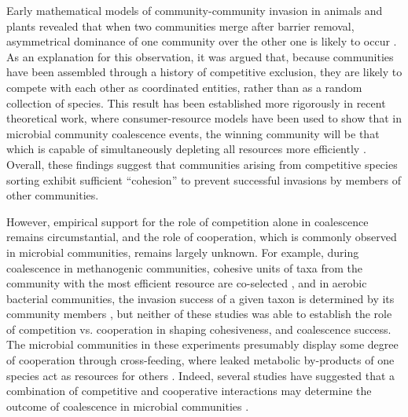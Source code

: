 \documentclass[10pt,letterpaper]{article}
\begin{document}
Early mathematical models of community-community invasion in animals and plants revealed that when two communities merge after barrier removal, asymmetrical dominance of one community over the other one is likely to occur \cite{Gilpin1994, Toquenaga1997}. As an explanation for this observation, it was argued that, because communities have been assembled through a history of competitive exclusion, they are likely to compete with each other as coordinated entities, rather than as a random collection of species. This result has been established more rigorously in recent theoretical work, where consumer-resource models have been used to show that in microbial community coalescence events, the winning community will be that which is capable of simultaneously depleting all resources more efficiently \cite{Tikhonov2016}. Overall, these findings suggest that communities arising from competitive species sorting exhibit sufficient ``cohesion'' to prevent successful invasions by members of other communities. 

However, empirical support for the role of competition alone in coalescence remains circumstantial, and the role of cooperation, which is commonly observed in microbial communities, remains largely unknown. For example, during coalescence in methanogenic communities, cohesive units of taxa from the community with the most efficient resource are co-selected \cite{Sierocinski2017}, and in aerobic bacterial communities, the invasion success of a given taxon is determined by its community members \cite{Lu2018}, but neither of these studies was able to establish the role of competition vs. cooperation in shaping cohesiveness, and coalescence success. The microbial communities in these experiments presumably display some degree of cooperation through cross-feeding, where leaked metabolic by-products of one species act as resources for others \cite{Hansen2007, Lawrence2012, Embree2015}. %
Indeed, several studies have suggested that a combination of competitive and cooperative interactions may determine the outcome of coalescence in microbial communities  \cite{Rivett2018, Albright2020, Castledine2020}. 
\end{document}
